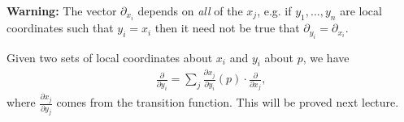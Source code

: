 \textbf{Warning:} The vector $\partial_{x_i}$ depends on \emph{all} of the $x_j$, e.g. if $y_1,...,y_n$ are local coordinates such that $y_i = x_i$ then it need not be true that $\partial_{y_i} = \partial_{x_i}$.

\begin{lem}\label{lem:}
	Given two sets of local coordinates about $x_i$ and $y_i$ about $p$, we have
	\begin{align*}
		\frac{\partial}{\partial y_i} = \sum_j \frac{\partial x_j}{\partial y_i}(p) \cdot \frac{\partial}{\partial x_j},
	\end{align*}
	where $\frac{\partial x_j}{\partial y_j}$ comes from the transition function. This will be proved next lecture.
\end{lem}

